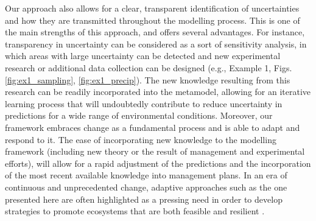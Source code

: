 Our approach also allows for a clear, transparent identification of uncertainties and how they are transmitted throughout the modelling process. 
This is one of the main strengths of this approach, and offers several advantages. 
For instance, transparency in uncertainty can be considered as a sort of sensitivity analysis, in which areas with large uncertainty can be detected and new experimental research or additional data collection can be designed (e.g., Example 1, Figs. \ref{fig:ex1_sampling}, \ref{fig:ex1_precip}).
The new knowledge resulting from this research can be readily incorporated into the metamodel, allowing for an iterative learning process that will undoubtedly contribute to reduce uncertainty in predictions for a wide range of environmental conditions. 
Moreover, our framework embraces change as a fundamental process and is able to adapt and respond to it. 
The ease of incorporating new knowledge to the modelling framework (including new theory or the result of management and experimental efforts), will allow for a rapid adjustment of the predictions and the incorporation of the most recent available knowledge into management plans. 
In an era of continuous and unprecedented change, adaptive approaches such as the one presented here are often highlighted as a pressing need in order to develop strategies to promote ecosystems that are both feasible and resilient \citep[Fig. \ref{fig:adaptive_management};][]{Seastedt2008, Mori2013}.
